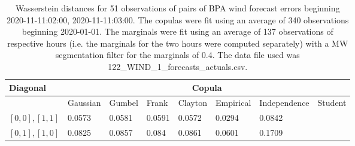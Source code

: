 \begin{table}[h] 
    \centering 
    \begin{tabular}{|l|l|l|l|l|l|l|l|} \hline 
        \textbf{Diagonal} & \multicolumn{7}{c|}{\textbf{Copula}} \\ \hline 
        & Gaussian & Gumbel & Frank & Clayton & Empirical & Independence & Student \\ \hline 
        $[0,0], [1,1]$ & 0.0573 & 0.0581 & 0.0591 & 0.0572 & 0.0294 & 0.0842 &  \\ \hline 
        $[0,1], [1,0]$ & 0.0825 & 0.0857 & 0.084 & 0.0861 & 0.0601 & 0.1709 &  \\ \hline 
    \end{tabular} 
    \caption{Wasserstein distances for 51 observations of pairs of BPA wind forecast errors beginning 2020-11-11:02:00, 2020-11-11:03:00. The copulas were fit  using an average of 340 observations beginning 2020-01-01. The marginals were fit using an average of 137 observations of respective hours (i.e. the  marginals for the two hours were computed separately) with a MW segmentation filter for the marginals of 0.4. The data file used was 122\_WIND\_1\_forecasts\_actuals.csv.} 
\end{table}